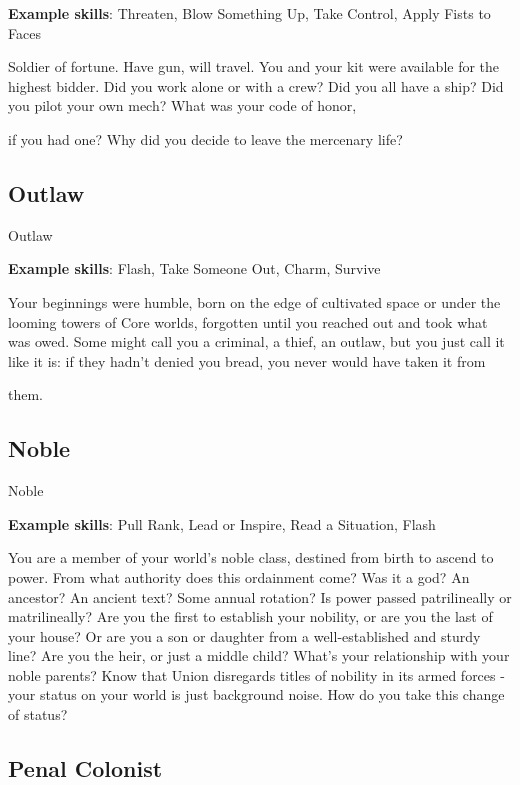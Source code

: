 \textbf{Example skills}: Threaten, Blow Something Up, Take Control, Apply Fists to Faces

Soldier of fortune. Have gun, will travel. You and your kit were available for the highest bidder. Did you work
alone or with a crew? Did you all have a ship? Did you pilot your own mech? What was your code of honor,

if you had one? Why did you decide to leave the mercenary life?

\subsection{Outlaw}
                                                       Outlaw

\textbf{Example skills}: Flash, Take Someone Out, Charm, Survive

Your beginnings were humble, born on the edge of cultivated space or under the looming towers of Core
worlds, forgotten until you reached out and took what was owed. Some might call you a criminal, a thief, an
outlaw, but you just call it like it is: if they hadn’t denied you bread, you never would have taken it from

them.

\subsection{Noble}
                                                        Noble

\textbf{Example skills}: Pull Rank, Lead or Inspire, Read a Situation, Flash

You are a member of your world’s noble class, destined from birth to ascend to power. From what authority
does this ordainment come? Was it a god? An ancestor? An ancient text? Some annual rotation? Is power passed patrilineally or matrilineally? Are you the first to establish your nobility, or are you the last of your
house? Or are you a son or daughter from a well-established and sturdy line? Are you the heir, or just a middle child? What’s your relationship with your noble parents? Know that Union disregards titles of nobility in its armed forces - your status on your world is just background noise. How do you take this
change of status?

\subsection{Penal Colonist}


